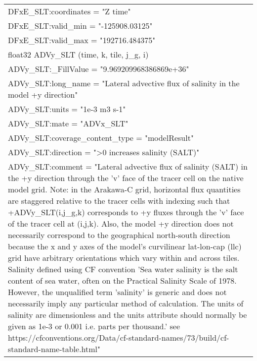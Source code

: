 \begin{longtable}{|p{\textwidth}|}
\hspace{0.5cm}\hspace{0.5cm}DFxE\_SLT:coordinates = "Z time"\\
\hspace{0.5cm}\hspace{0.5cm}DFxE\_SLT:valid\_min = "-125908.03125"\\
\hspace{0.5cm}\hspace{0.5cm}DFxE\_SLT:valid\_max = "192716.484375"\\
\hspace{0.5cm}float32 ADVy\_SLT (time, k, tile, j\_g, i)\\
\hspace{0.5cm}\hspace{0.5cm}ADVy\_SLT:\_FillValue = "9.969209968386869e+36"\\
\hspace{0.5cm}\hspace{0.5cm}ADVy\_SLT:long\_name = "Lateral advective flux of salinity in the model +y direction"\\
\hspace{0.5cm}\hspace{0.5cm}ADVy\_SLT:units = "1e-3 m3 s-1"\\
\hspace{0.5cm}\hspace{0.5cm}ADVy\_SLT:mate = "ADVx\_SLT"\\
\hspace{0.5cm}\hspace{0.5cm}ADVy\_SLT:coverage\_content\_type = "modelResult"\\
\hspace{0.5cm}\hspace{0.5cm}ADVy\_SLT:direction = ">0 increases salinity (SALT)"\\
\hspace{0.5cm}\hspace{0.5cm}ADVy\_SLT:comment = "Lateral advective flux of salinity (SALT) in the +y direction through the 'v' face of the tracer cell on the native model grid. Note: in the Arakawa-C grid, horizontal flux quantities are staggered relative to the tracer cells with indexing such that +ADVy\_SLT(i,j\_g,k) corresponds to +y fluxes through the 'v' face of the tracer cell at (i,j,k). Also, the model +y direction does not necessarily correspond to the geographical north-south direction because the x and y axes of the model's curvilinear lat-lon-cap (llc) grid have arbitrary orientations which vary within and across tiles. Salinity defined using CF convention 'Sea water salinity is the salt content of sea water, often on the Practical Salinity Scale of 1978. However, the unqualified term 'salinity' is generic and does not necessarily imply any particular method of calculation. The units of salinity are dimensionless and the units attribute should normally be given as 1e-3 or 0.001 i.e. parts per thousand.' see https://cfconventions.org/Data/cf-standard-names/73/build/cf-standard-name-table.html"\\

\end{longtable}
